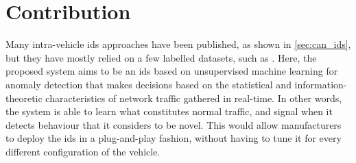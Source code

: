 \chapter{Contribution}
\label{c:contribution}

Many intra-vehicle \gls{ids} approaches have been published, as shown in \ref{sec:can_ids}, but they have mostly relied on a few labelled datasets, such as \cite{CANDataset_Car-Hacking}. Here, the proposed system aims to be an \gls{ids} based on unsupervised machine learning for anomaly detection that makes decisions based on the statistical and information-theoretic characteristics of network traffic gathered in real-time. In other words, the system is able to learn what constitutes normal traffic, and signal when it detects behaviour that it considers to be novel. This would allow manufacturers to deploy the \gls{ids} in a plug-and-play fashion, without having to tune it for every different configuration of the vehicle.
